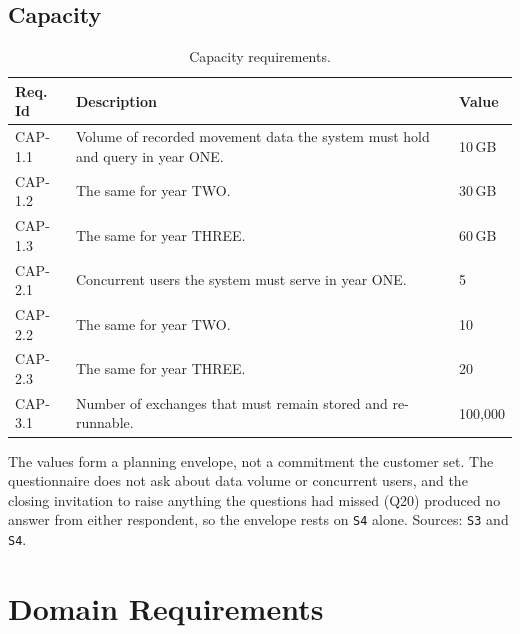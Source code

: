 \documentclass[12pt,a4paper]{report}
\begin{document}
\section{Capacity}
\label{sec:capacity}

\begin{table}[H]
  \centering
  \caption{Capacity requirements.}
  \label{tab:capacity}
  \begin{tabular}{@{}l >{\raggedright\arraybackslash}p{11.0cm} l@{}}
    \toprule[1.5pt]
    \textbf{Req. Id} & \textbf{Description} & \textbf{Value} \\
    \midrule
    CAP-1.1 & Volume of recorded movement data the system must hold and
      query in year ONE. & 10\,GB \\
    \addlinespace
    CAP-1.2 & The same for year TWO. & 30\,GB \\
    \addlinespace
    CAP-1.3 & The same for year THREE. & 60\,GB \\
    \addlinespace
    CAP-2.1 & Concurrent users the system must serve in year ONE. & 5 \\
    \addlinespace
    CAP-2.2 & The same for year TWO. & 10 \\
    \addlinespace
    CAP-2.3 & The same for year THREE. & 20 \\
    \addlinespace
    CAP-3.1 & Number of exchanges that must remain stored and re-runnable.
      & 100,000 \\
    \bottomrule[1.5pt]
  \end{tabular}
\end{table}

The values form a planning envelope, not a commitment the customer set. The
questionnaire does not ask about data volume or concurrent users, and the
closing invitation to raise anything the questions had missed (Q20) produced
no answer from either respondent, so the envelope rests on \texttt{S4} alone.
Sources: \texttt{S3} and \texttt{S4}.

\chapter{Domain Requirements}
\label{ch:domain}
\end{document}
